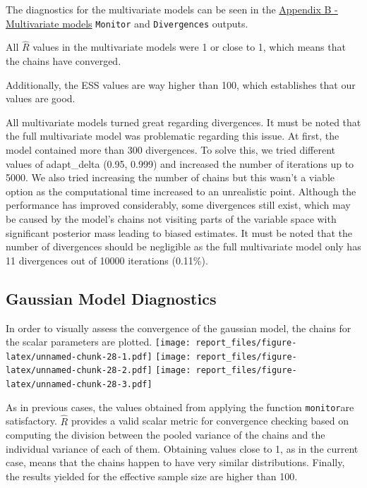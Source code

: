 \documentclass[
]{article}
\begin{document}
The diagnostics for the multivariate models can be seen in the
\protect\hyperlink{apb}{Appendix B - Multivariate models}
\texttt{Monitor} and \texttt{Divergences} outputs.

All \(\hat{R}\) values in the multivariate models were 1 or close to 1,
which means that the chains have converged.

Additionally, the ESS values are way higher than 100, which establishes
that our values are good.

All multivariate models turned great regarding divergences. It must be
noted that the full multivariate model was problematic regarding this
issue. At first, the model contained more than 300 divergences. To solve
this, we tried different values of adapt\_delta (0.95, 0.999) and
increased the number of iterations up to 5000. We also tried increasing
the number of chains but this wasn't a viable option as the
computational time increased to an unrealistic point. Although the
performance has improved considerably, some divergences still exist,
which may be caused by the model's chains not visiting parts of the
variable space with significant posterior mass leading to biased
estimates. It must be noted that the number of divergences should be
negligible as the full multivariate model only has 11 divergences out of
10000 iterations (0.11\%).

\hypertarget{gaussian-model-diagnostics}{%
\subsection{Gaussian Model
Diagnostics}\label{gaussian-model-diagnostics}}

In order to visually assess the convergence of the gaussian model, the
chains for the scalar parameters are plotted.
\texttt{[image: report\_files/figure-latex/unnamed-chunk-28-1.pdf]}
\texttt{[image: report\_files/figure-latex/unnamed-chunk-28-2.pdf]}
\texttt{[image: report\_files/figure-latex/unnamed-chunk-28-3.pdf]}

As in previous cases, the values obtained from applying the function
\texttt{monitor}are satisfactory. \(\hat{R}\) provides a valid scalar
metric for convergence checking based on computing the division between
the pooled variance of the chains and the individual variance of each of
them. Obtaining values close to 1, as in the current case, means that
the chains happen to have very similar distributions. Finally, the
results yielded for the effective sample size are higher than 100.
\end{document}
